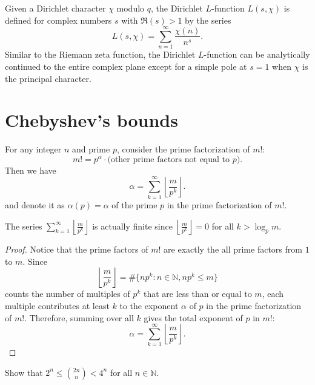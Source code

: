 \documentclass{elegantbook}
\begin{document}
\begin{definition}
  Given a Dirichlet character $\chi$ modulo $q$, the Dirichlet $L$-function $L(s, \chi)$ is defined for complex numbers $s$ with $\Re(s) > 1$ by the series
  \[
    L(s, \chi) = \sum_{n=1}^{\infty} \frac{\chi(n)}{n^s}.
  \]
  Similar to the Riemann zeta function, the Dirichlet $L$-function can be analytically continued to the entire complex plane except for a simple pole at $s=1$ when $\chi$ is the principal character.
\end{definition}

\section{Chebyshev's bounds}

\begin{lemma} \label{lem:Legendre_formula}
  For any integer $n$ and prime $p$, consider the prime factorization of $m!$:
  \[
    m! = p^{\alpha} \cdot \text{(other prime factors not equal to } p\text{)}.
  \]
  Then we have
  \[
    \alpha = \sum_{k=1}^{\infty} \left\lfloor \frac{m}{p^k} \right\rfloor.
  \]
  and denote it as $\alpha(p)=\alpha$ of the prime $p$ in the prime factorization of $m!$.
\end{lemma}

\begin{note} \label{note:Legendre_formula_finite_sum}
  The series $\sum_{k=1}^{\infty} \left\lfloor \frac{m}{p^k} \right\rfloor$ is actually finite since $\left\lfloor \frac{m}{p^k} \right\rfloor = 0$ for all $k > \log_p m$.
\end{note}

\begin{proof}
  Notice that the prime factors of $m!$ are exactly the all prime factors from $1$ to $m$. Since
  \[
    \left\lfloor \frac{m}{p^k} \right\rfloor = \#\{np^k:n\in\mathbb{N}, np^k \leq m\}
  \]
  counts the number of multiples of $p^k$ that are less than or equal to $m$, each multiple contributes at least $k$ to the exponent $\alpha$ of $p$ in the prime factorization of $m!$. Therefore, summing over all $k$ gives the total exponent of $p$ in $m!$:
  \[
    \alpha = \sum_{k=1}^{\infty} \left\lfloor \frac{m}{p^k} \right\rfloor.
  \]
\end{proof}

\begin{exercise} \label{ex:2n_choose_n_bounds}
  Show that $2^n\leq\binom{2n}{n}<4^n$ for all $n \in \mathbb{N}$.
\end{exercise}
\end{document}
